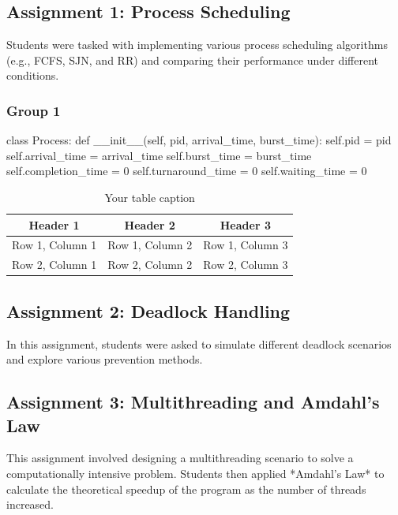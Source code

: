 \documentclass[12pt]{article}
\begin{document}
\subsection{Assignment 1: Process Scheduling}
Students were tasked with implementing various process scheduling algorithms (e.g., FCFS, SJN, and RR) and comparing their performance under different conditions.
\subsubsection{Group 1}
\begin{python}
    class Process:
    def __init__(self, pid, arrival_time, burst_time):
        self.pid = pid
        self.arrival_time = arrival_time
        self.burst_time = burst_time
        self.completion_time = 0
        self.turnaround_time = 0
        self.waiting_time = 0
\end{python}

\begin{table}[htbp] %
    \centering
    \begin{tabular}{|c|c|c|} %
    \hline
    Header 1 & Header 2 & Header 3 \\ %
    \hline
    Row 1, Column 1 & Row 1, Column 2 & Row 1, Column 3 \\ %
    \hline
    Row 2, Column 1 & Row 2, Column 2 & Row 2, Column 3 \\ %
    \hline
    \end{tabular}
    \caption{Your table caption} %
    \label{tab:your_label} %
\end{table}

\subsection{Assignment 2: Deadlock Handling}
In this assignment, students were asked to simulate different deadlock scenarios and explore various prevention methods.

\subsection{Assignment 3: Multithreading and Amdahl's Law}
This assignment involved designing a multithreading scenario to solve a computationally intensive problem. Students then applied *Amdahl's Law* to calculate the theoretical speedup of the program as the number of threads increased.
\end{document}
